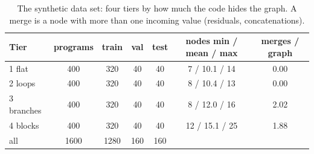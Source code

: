 \begin{table}[!h]
\centering
\small
\begin{tabular}{lcccccc}
\hline
Tier & programs & train & val & test & nodes min / mean / max & merges / graph \\
\hline
1 flat & 400 & 320 & 40 & 40 & 7 / 10.1 / 14 & 0.00 \\
2 loops & 400 & 320 & 40 & 40 & 8 / 10.4 / 13 & 0.00 \\
3 branches & 400 & 320 & 40 & 40 & 8 / 12.0 / 16 & 2.02 \\
4 blocks & 400 & 320 & 40 & 40 & 12 / 15.1 / 25 & 1.88 \\
all & 1600 & 1280 & 160 & 160 &  &  \\
\hline
\end{tabular}
\caption{The synthetic data set: four tiers by how much the code hides the graph. A merge is a node with more than one incoming value (residuals, concatenations).}\label{tab:data}
\end{table}
